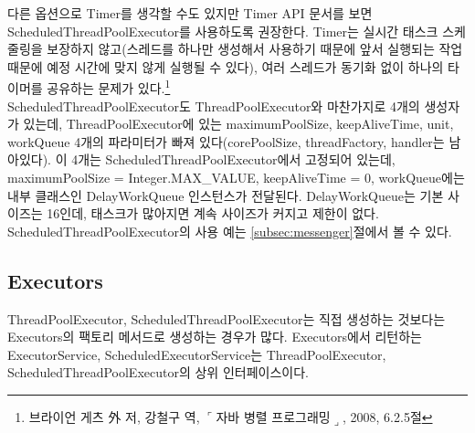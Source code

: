 다른 옵션으로 Timer를 생각할 수도 있지만 Timer API 문서를 보면 ScheduledThreadPoolExecutor를 사용하도록 권장한다. 
Timer는 실시간 태스크 스케줄링을 보장하지 않고(스레드를 하나만 생성해서 사용하기 때문에 앞서 실행되는 작업 때문에 예정 시간에 맞지 않게 실행될 수 있다), 여러 스레드가 동기화 없이 하나의 타이머를 공유하는 문제가 있다.\footnote{브라이언 게츠 外 저, 강철구 역, $\ulcorner$자바 병렬 프로그래밍$\lrcorner$, 2008, 6.2.5절}\\

ScheduledThreadPoolExecutor도 ThreadPoolExecutor와 마찬가지로 4개의 생성자가 있는데, ThreadPoolExecutor에 있는 maximumPoolSize, keepAliveTime, unit, workQueue 4개의 파라미터가 빠져 있다(corePoolSize, threadFactory, handler는 남아있다).
이 4개는 ScheduledThreadPoolExecutor에서 고정되어 있는데,
maximumPoolSize = Integer.MAX\_VALUE, keepAliveTime = 0, workQueue에는 내부 클래스인 DelayWorkQueue 인스턴스가 전달된다.
DelayWorkQueue는 기본 사이즈는 16인데, 태스크가 많아지면 계속 사이즈가 커지고 제한이 없다.\\

ScheduledThreadPoolExecutor의 사용 예는 \ref{subsec:messenger}절에서 볼 수 있다.

\subsection{Executors}
ThreadPoolExecutor, ScheduledThreadPoolExecutor는 직접 생성하는 것보다는 Executors의 팩토리 메서드로 생성하는 경우가 많다.
Executors에서 리턴하는 ExecutorService, ScheduledExecutorService는 ThreadPoolExecutor, ScheduledThreadPoolExecutor의 상위 인터페이스이다.\\

